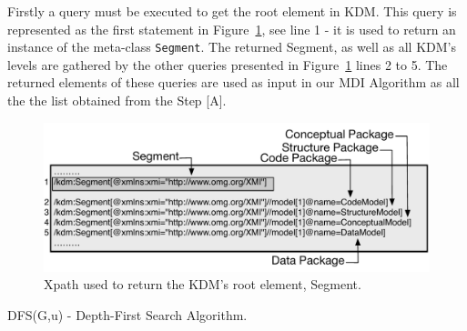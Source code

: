 
Firstly a query must be executed to get the root element in KDM. This query is represented as the first statement in Figure~\ref{fig:queriesXPath}, see line 1 - it is used to return an instance of the meta-class \texttt{Segment}. The returned Segment, as well as all KDM's levels are gathered by the other queries presented in Figure~\ref{fig:queriesXPath} lines 2 to 5. The returned elements of these queries are used as input in our MDI Algorithm as all the the list obtained from the Step [A].

\begin{figure}[h]
	\centering
	\includegraphics[scale=0.479]{figuras/queiresANDATLSBESNew}
	\caption{Xpath used to return the KDM's root element, Segment.}
	\label{fig:queriesXPath}
\end{figure}


\begin{algorithm}[h]
     \SetAlgoLined
     \caption{DFS(G,u) - Depth-First Search Algorithm.}
     \label{alg:death1}
   \end{algorithm}

